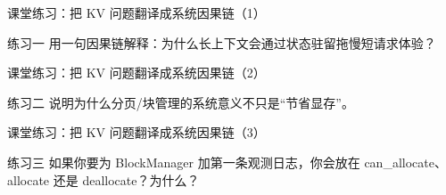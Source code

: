 \begin{frame}{课堂练习：把 KV 问题翻译成系统因果链（1）}
\begin{block}{练习一}
    用一句因果链解释：为什么长上下文会通过状态驻留拖慢短请求体验？
  \end{block}
\end{frame}

\begin{frame}{课堂练习：把 KV 问题翻译成系统因果链（2）}
\begin{block}{练习二}
    说明为什么分页/块管理的系统意义不只是“节省显存”。
  \end{block}
\end{frame}

\begin{frame}{课堂练习：把 KV 问题翻译成系统因果链（3）}
\begin{block}{练习三}
    如果你要为 BlockManager 加第一条观测日志，你会放在 can\_allocate、allocate 还是 deallocate？为什么？
  \end{block}
\end{frame}
